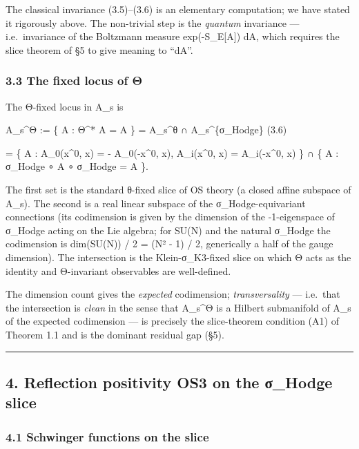 \documentclass[
 11pt,
 a4paper,
]{article}
\begin{document}
The classical invariance (3.5)--(3.6) is an elementary computation; we have stated it rigorously above. The non-trivial step is the \emph{quantum} invariance --- i.e.~invariance of the Boltzmann measure exp(-S\_E{[}A{]}) dA, which requires the slice theorem of §5 to give meaning to ``dA''.

\hypertarget{the-fixed-locus-of-ux3b8}{%
\subsubsection{3.3 The fixed locus of Θ}\label{the-fixed-locus-of-ux3b8}}

The Θ-fixed locus in A\_s is

A\_s\^{}Θ := \{ A : Θ\^{}* A = A \} = A\_s\^{}θ ∩ A\_s\^{}\{σ\_Hodge\} (3.6)

= \{ A : A\_0(x\^{}0, x) = - A\_0(-x\^{}0, x), A\_i(x\^{}0, x) = A\_i(-x\^{}0, x) \} ∩ \{ A : σ\_Hodge ∘ A ∘ σ\_Hodge = A \}.

The first set is the standard θ-fixed slice of OS theory (a closed affine subspace of A\_s). The second is a real linear subspace of the σ\_Hodge-equivariant connections (its codimension is given by the dimension of the -1-eigenspace of σ\_Hodge acting on the Lie algebra; for SU(N) and the natural σ\_Hodge the codimension is dim(SU(N)) / 2 = (N² - 1) / 2, generically a half of the gauge dimension). The intersection is the Klein-σ\_K3-fixed slice on which Θ acts as the identity and Θ-invariant observables are well-defined.

The dimension count gives the \emph{expected} codimension; \emph{transversality} --- i.e.~that the intersection is \emph{clean} in the sense that A\_s\^{}Θ is a Hilbert submanifold of A\_s of the expected codimension --- is precisely the slice-theorem condition (A1) of Theorem 1.1 and is the dominant residual gap (§5).

\begin{center}\rule{0.5\linewidth}{0.5pt}\end{center}

\hypertarget{reflection-positivity-os3-on-the-ux3c3_hodge-slice}{%
\subsection{4. Reflection positivity OS3 on the σ\_Hodge slice}\label{reflection-positivity-os3-on-the-ux3c3_hodge-slice}}

\hypertarget{schwinger-functions-on-the-slice}{%
\subsubsection{4.1 Schwinger functions on the slice}\label{schwinger-functions-on-the-slice}}
\end{document}
